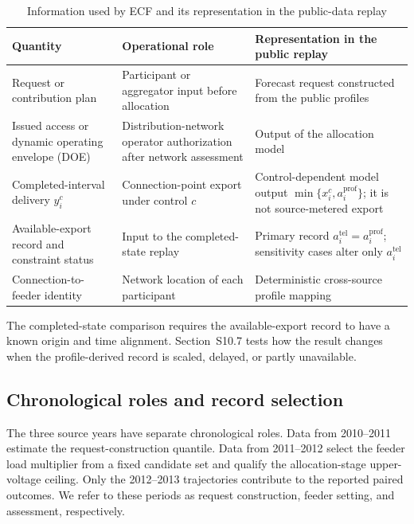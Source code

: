 \documentclass[11pt]{article}
\begin{document}
\begin{table}[!ht]
\centering
\caption{Information used by ECF and its representation in the public-data replay}
\label{tab:supp_deployment_information_contract}
\scriptsize
\setlength{\tabcolsep}{2.7pt}
\begin{tabular}{@{}>{\raggedright\arraybackslash}p{}>{\raggedright\arraybackslash}p{}>{\raggedright\arraybackslash}p{}@{}}
\toprule
Quantity & Operational role & Representation in the public replay \\
\midrule
Request or contribution plan & Participant or aggregator input before allocation & Forecast request constructed from the public profiles \\
Issued access or dynamic operating envelope (DOE) & Distribution-network operator authorization after network assessment & Output of the allocation model \\
Completed-interval delivery $y_i^c$ & Connection-point export under control $c$ & Control-dependent model output $\min\{x_i^c,a_i^{\mathrm{prof}}\}$; it is not source-metered export \\
Available-export record and constraint status & Input to the completed-state replay & Primary record $a_i^{\mathrm{tel}}=a_i^{\mathrm{prof}}$; sensitivity cases alter only $a_i^{\mathrm{tel}}$ \\
Connection-to-feeder identity & Network location of each participant & Deterministic cross-source profile mapping \\
\bottomrule
\end{tabular}
\end{table}

The completed-state comparison requires the available-export record to have a
known origin and time alignment. Section~S10.7 tests how the result changes when
the profile-derived record is scaled, delayed, or partly unavailable.

\subsection{Chronological roles and record selection}
\label{supp:au_calendar}

The three source years have separate chronological roles. Data from 2010--2011
estimate the request-construction quantile. Data from 2011--2012 select the
feeder load multiplier from a fixed candidate set and qualify the allocation-stage
upper-voltage ceiling. Only the 2012--2013 trajectories contribute to the reported paired
outcomes. We refer to these periods as request construction, feeder setting, and
assessment, respectively.
\end{document}
